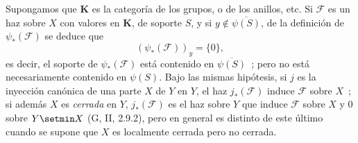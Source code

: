 \begin{env}[3.4.6]
\label{0.3.4.6-fr}
Supongamos que $\boldsymbol{K}$ es la categoría de los grupos, o de los anillos, etc.
Si $\mathcal{F}$ es un haz sobre $X$ con valores en $\boldsymbol{K}$, de
soporte $S$, y si $y\notin\overline{\psi(S)}$, de la definición de
$\psi_*(\mathcal{F})$ se deduce que
\[
  (\psi_*(\mathcal{F}))_y=\{0\},
\]
es decir, el soporte de $\psi_*(\mathcal{F})$ está contenido en
$\overline{\psi(S)}$~; pero no está necesariamente contenido en
$\psi(S)$. Bajo las mismas hipótesis, si $j$ es la inyección canónica de una
parte $X$ de $Y$ en $Y$, el haz $j_*(\mathcal{F})$ induce
$\mathcal{F}$ sobre $X$~; si además $X$ es \emph{cerrada} en $Y$,
$j_*(\mathcal{F})$ es el haz sobre $Y$ que induce $\mathcal{F}$ sobre $X$
y $0$ sobre $Y\setmin X$ (G, II, 2.9.2), pero en general es distinto de este último
cuando se supone que $X$ es localmente cerrada pero no cerrada.
\end{env}
